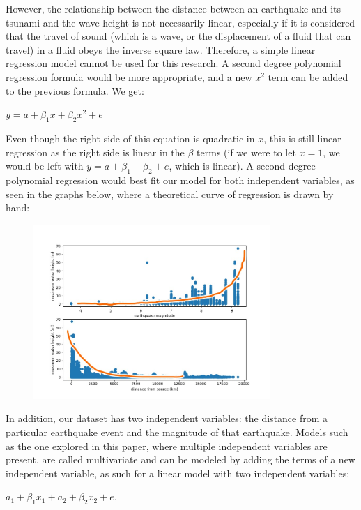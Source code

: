 \documentclass[11pt,letterpaper]{article}
\begin{document}
However, the relationship between the distance between an earthquake and its tsunami and the wave height is not necessarily linear, especially if it is considered that the travel of sound (which is a wave, or the displacement of a fluid that can travel) in a fluid obeys the inverse square law. Therefore, a simple linear regression model cannot be used for this research. A second degree polynomial regression formula would be more appropriate, and a new $x^2$ term can be added to the previous formula. We get:

$y = a + \beta_1 x + \beta_2 x^2 + e$

Even though the right side of this equation is quadratic in $x$, this is still linear regression as the right side is linear in the $\beta$ terms (if we were to let $x = 1$, we would be left with $y = a + \beta_1 + \beta_2 + e$, which is linear). A second degree polynomial regression would best fit our model for both independent variables, as seen in the graphs below, where a theoretical curve of regression is drawn by hand:

\begin{figure}[H]
    \centering
    \includegraphics[width=0.8\textwidth]{modelshowcase.jpeg}
    \label{fig:boat1}
\end{figure}

In addition, our dataset has two independent variables: the distance from a particular earthquake event and the magnitude of that earthquake. Models such as the one explored in this paper, where multiple independent variables are present, are called multivariate and can be modeled by adding the terms of a new independent variable, as such for a linear model with two independent variables:

$a_1 + \beta_1 x_1 + a_2 + \beta_2 x_2 + e$,
\end{document}
